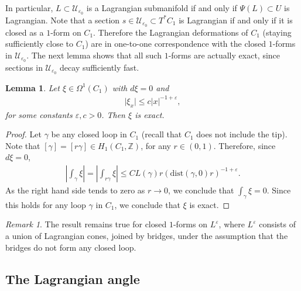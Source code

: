 \documentclass[11pt]{amsart}
\newtheorem{lemma}{Lemma}
\theoremstyle{definition}
\theoremstyle{remark}
\newtheorem{remark}{Remark}
\newcommand{\dist}{\mathrm{dist}}
\begin{document}
In particular, $L\subset \mathcal{U}_{\varepsilon_0}$ is a Lagrangian submanifold if and only if $\Psi(L)\subset U$ is Lagrangian.
Note that a section $s\in \mathcal{U}_{\varepsilon_0}\subset T^\ast C_1$ is Lagrangian if and only if it is closed as a $1$-form on $C_1$. Therefore the Lagrangian deformations of $C_1$ (staying sufficiently close to $C_1$) are in one-to-one correspondence with the closed $1$-forms in $\mathcal{U}_{\varepsilon_0}$.
The next lemma shows that all such $1$-forms are actually exact, since sections in $\mathcal{U}_{\varepsilon_0}$ decay sufficiently fast.
\begin{lemma}\label{lem: decaying-closed-forms-are-exact}
    Let $\xi\in \Omega^1(C_1)$ with $d\xi=0$ and
    \begin{align*}
        \lvert \xi_x\rvert\leq c\lvert x\rvert^{-1+\varepsilon},
    \end{align*}
    for some constants $\varepsilon, c>0$. Then $\xi$ is exact.
\end{lemma}
\begin{proof}
    Let $\gamma$ be any closed loop in $C_1$ (recall that $C_1$ does not include the tip). Note that $[\gamma]=[r\gamma]\in H_1(C_1,\mathbb{Z})$, for any $r\in (0,1)$. Therefore, since $d\xi=0$,
    \begin{align*}
        \left\lvert\int_\gamma \xi\right\rvert=\left\lvert\int_{r\gamma}\xi\right\rvert\leq CL(\gamma)r (\dist(\gamma, 0) r)^{-1+\varepsilon}.
    \end{align*}
    As the right hand side tends to zero as $r\to0$, we conclude that $\int_\gamma \xi=0$. Since this holds for any loop $\gamma$ in $C_1$, we conclude that $\xi$ is exact.
\end{proof}

\begin{remark}\label{rmk: decaying-closed-forms-are-exact}
    The result remains true for closed $1$-forms on $L^\varepsilon$, where $L^\varepsilon$ consists of a union of Lagrangian cones, joined by bridges, under the assumption that the bridges do not form any closed loop.
\end{remark}


\subsection{The Lagrangian angle}
\end{document}
